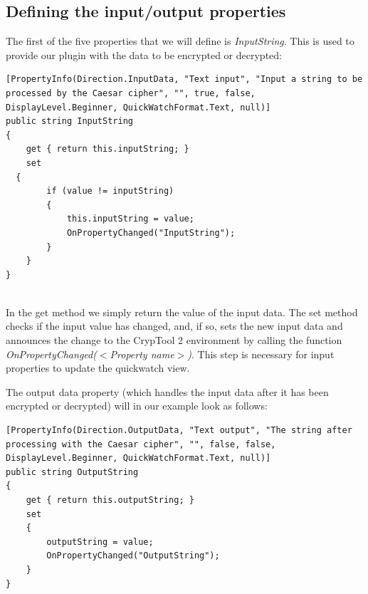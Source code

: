 \subsection{Defining the input/output properties}
\label{sec:DefiningTheInputOutputProperties}

The first of the five properties that we will define is \textit{InputString}. This is used to provide our plugin with the data to be encrypted or decrypted:

\begin{lstlisting}
[PropertyInfo(Direction.InputData, "Text input", "Input a string to be processed by the Caesar cipher", "", true, false, DisplayLevel.Beginner, QuickWatchFormat.Text, null)]
public string InputString
{
	get { return this.inputString; }
	set
  {
		if (value != inputString)
		{
			this.inputString = value;
			OnPropertyChanged("InputString");
		}
	}
}
\end{lstlisting}

\ \\
In the get method we simply return the value of the input data. The set method checks if the input value has changed, and, if so, sets the new input data and announces the change to the CrypTool 2 environment by calling the function \textit{OnPropertyChanged(\textit{$<$Property name$>$})}. This step is necessary for input properties to update the quickwatch view.
\clearpage


The output data property (which handles the input data after it has been encrypted or decrypted) will in our example look as follows:

\begin{lstlisting}
[PropertyInfo(Direction.OutputData, "Text output", "The string after processing with the Caesar cipher", "", false, false, DisplayLevel.Beginner, QuickWatchFormat.Text, null)]
public string OutputString
{
	get { return this.outputString; }
	set
	{
		outputString = value;
		OnPropertyChanged("OutputString");
	}
}
\end{lstlisting}

